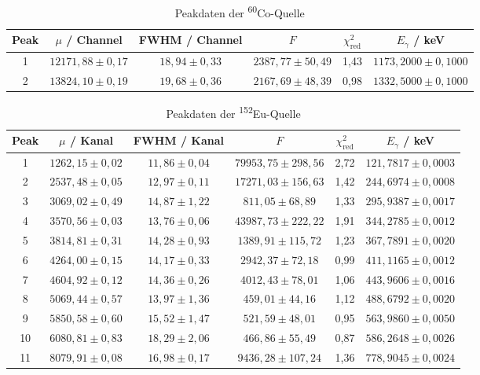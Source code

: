 \begin{table}[H]
\centering
\caption{Peakdaten der \textsuperscript{60}Co-Quelle}
\begin{tabular}{|c|c|c|c|c|c|}
\hline
Peak & $\mu$ / Channel & FWHM / Channel & $F$ & $\chi^2_\mathrm{red}$ & $E_\gamma$ / keV \\
\hline
1 & $12171,88 \pm 0,17$ & $18,94 \pm 0,33$ & $2387,77 \pm 50,49$ & 1,43 & $1173,2000 \pm 0,1000$ \\
2 & $13824,10 \pm 0,19$ & $19,68 \pm 0,36$ & $2167,69 \pm 48,39$ & 0,98 & $1332,5000 \pm 0,1000$ \\
\hline
\end{tabular}
\label{HPGe_Cobalt}
\end{table}

\begin{table}[H]
\centering
\caption{Peakdaten der \textsuperscript{152}Eu-Quelle}
\scriptsize
\begin{tabular}{|c|c|c|c|c|c|}
\hline
Peak & $\mu$ / Kanal & FWHM / Kanal & $F$ & $\chi^2_\mathrm{red}$ & $E_\gamma$ / keV \\
\hline
1 & $1262,15 \pm 0,02$ & $11,86 \pm 0,04$ & $79953,75 \pm 298,56$ & 2,72 & $121,7817 \pm 0,0003$ \\
2 & $2537,48 \pm 0,05$ & $12,97 \pm 0,11$ & $17271,03 \pm 156,63$ & 1,42 & $244,6974 \pm 0,0008$ \\
3 & $3069,02 \pm 0,49$ & $14,87 \pm 1,22$ & $811,05 \pm 68,89$ & 1,33 & $295,9387 \pm 0,0017$ \\
4 & $3570,56 \pm 0,03$ & $13,76 \pm 0,06$ & $43987,73 \pm 222,22$ & 1,91 & $344,2785 \pm 0,0012$ \\
5 & $3814,81 \pm 0,31$ & $14,28 \pm 0,93$ & $1389,91 \pm 115,72$ & 1,23 & $367,7891 \pm 0,0020$ \\
6 & $4264,00 \pm 0,15$ & $14,17 \pm 0,33$ & $2942,37 \pm 72,18$ & 0,99 & $411,1165 \pm 0,0012$ \\
7 & $4604,92 \pm 0,12$ & $14,36 \pm 0,26$ & $4012,43 \pm 78,01$ & 1,06 & $443,9606 \pm 0,0016$ \\
8 & $5069,44 \pm 0,57$ & $13,97 \pm 1,36$ & $459,01 \pm 44,16$ & 1,12 & $488,6792 \pm 0,0020$ \\
9 & $5850,58 \pm 0,60$ & $15,52 \pm 1,47$ & $521,59 \pm 48,01$ & 0,95 & $563,9860 \pm 0,0050$ \\
10 & $6080,81 \pm 0,83$ & $18,29 \pm 2,06$ & $466,86 \pm 55,49$ & 0,87 & $586,2648 \pm 0,0026$ \\
11 & $8079,91 \pm 0,08$ & $16,98 \pm 0,17$ & $9436,28 \pm 107,24$ & 1,36 & $778,9045 \pm 0,0024$ \\

\end{tabular}
\end{table}
